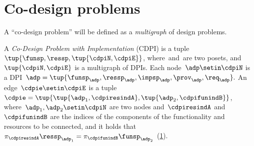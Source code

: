 
\section{Co-design problems}
\label{sec:Co-design-problems}

A ``co-design problem'' will be defined as a \emph{multigraph} of design problems.
\begin{definition}
    \label{def:cdpi}
    A \emph{Co-Design Problem with Implementation} (CDPI) is a tuple~$\tup{\funsp,\ressp,\tup{\cdpiN,\cdpiE}}$, where~\funsp and~\ressp are two posets, and~$\tup{ \cdpiN,\cdpiE}$ is a multigraph of DPIs.
    Each node~$\adp\setin\cdpiN$ is a DPI~$\adp=\tup{\funsp_{\adp},\ressp_{\adp},\impsp_{\adp},\prov_{\adp},\req_{\adp}}.
    $
    An edge~$\cdpie\setin\cdpiE$ is a tuple $\cdpie=\tup{ \tup{ \adp_1,\cdpiresindA} ,\tup{\adp_2,\cdpifunindB}}$, where~$\adp_1,\adp_2\setin\cdpiN$ are two nodes and~$\cdpiresindA$ and~$\cdpifunindB$ are the indices of the components of the functionality and resources to be connected, and it holds that~$\pi_{\cdpiresindA}\ressp_{\adp_1}=\pi_{\cdpifunindB}\funsp_{\adp_2}$~(\cref{fig:mcdps}).

\end{definition}

\begin{figure}[h]
    \centering
    \caption{}
    \label{fig:mcdps}
\end{figure}

